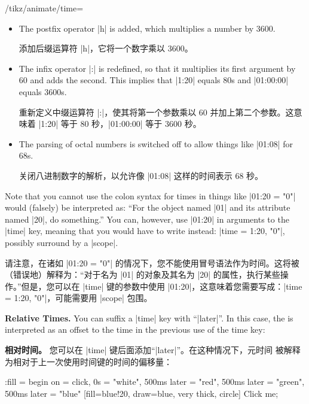 \begin{key}{/tikz/animate/time=}
\begin{itemize}
        \item The postfix operator |h| is added, which multiplies a number by
            3600.

            添加后缀运算符 |h|，它将一个数字乘以 3600。


        \item The infix operator |:| is redefined, so that it multiplies its
            first argument by 60 and adds the second. This implies that |1:20|
            equals 80s and |01:00:00| equals 3600s.

            重新定义中缀运算符 |:|，使其将第一个参数乘以 60 并加上第二个参数。这意味着 |1:20| 等于 80 秒，|01:00:00| 等于 3600 秒。


        \item The parsing of octal numbers is switched off to allow things like
            |01:08| for 68s.

            关闭八进制数字的解析，以允许像 |01:08| 这样的时间表示 68 秒。


    \end{itemize}

    Note that you cannot use the colon syntax for times in things like
    |01:20 = "0"| would (falsely) be interpreted as: ``For the object named |01|
    and its attribute named |20|, do something.'' You can, however, use |01:20|
    in arguments to the |time| key, meaning that you would have to write
    instead: |time = 1:20, "0"|, possibly surround by a |scope|.

    请注意，在诸如 |01:20 = "0"| 的情况下，您不能使用冒号语法作为时间。这将被（错误地）解释为：“对于名为 |01| 的对象及其名为 |20| 的属性，执行某些操作。”但是，您可以在 |time| 键的参数中使用 |01:20|，这意味着您需要写成：|time = 1:20, "0"|，可能需要用 |scope| 包围。



    \medskip\textbf{Relative Times.}
    You can suffix a |time| key with ``|later|''. In this case, the 
    is interpreted as an offset to the time in the previous use of the time
    key:
    
    \medskip\textbf{相对时间。}
您可以在 |time| 键后面添加“|later|”。在这种情况下，元时间  被解释为相对于上一次使用时间键的时间的偏移量：


\begin{codeexample}[
    preamble={\usetikzlibrary{animations}},
    animation list={0.5,1,1.5,2},
]
\tikz \node :fill = { begin on = click,
    0s = "white",
    500ms later = "red",
    500ms later = "green",  %
    500ms later = "blue"} %
  [fill=blue!20, draw=blue, very thick, circle] {Click me};
\end{codeexample}


\end{key}
